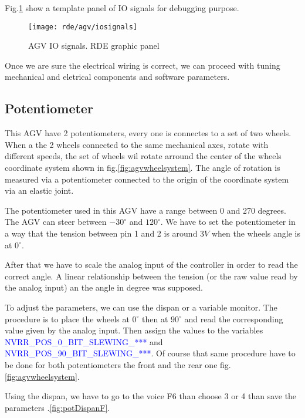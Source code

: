 Fig.\ref{fig:iosignals} show a template panel of IO signals for debugging purpose.
\begin{figure}[!]
	\centering\texttt{[image: rde/agv/iosignals]}
	\caption{AGV IO signals. RDE graphic panel}
	\label{fig:iosignals}
\end{figure}

Once we are sure the electrical wiring is correct, we can proceed with tuning mechanical and eletrical components and software parameters.

%
\subsection{Potentiometer}
This AGV have 2 potentiometers, every one is connectes to a set of two wheels. When a the 2 wheels connected to the same mechanical axes, rotate with different speeds, the set of wheels wil rotate arround the center of the wheels coordinate system shown in fig.\ref{fig:agvwheelsystem}. The angle of rotation is measured via a potentiometer connected to the origin of the coordinate system via an elastic joint.

The potentiometer used in this AGV have a range between 0 and 270 degrees. The AGV can steer between $-30^{\circ}$ and $120^{\circ}$. We have to set the potentiometer in a way that the tension between pin 1 and 2 is around $3V$ when the wheels angle is at $0^{\circ}$.

After that we have to scale the analog input of the controller in order to read the correct angle. A linear relationship between the tension (or the raw value read by the analog input) an the angle in degree was supposed.

To adjust the parameters, we can use the dispan or a variable monitor. The procedure is to place the wheels at $0^{\circ}$ then at $90^{\circ}$ and read the corresponding value given by the analog input. Then assign the values to the variables \textcolor{blue}{NVRR\_POS\_0\_BIT\_SLEWING\_***} and \textcolor{blue}{NVRR\_POS\_90\_BIT\_SLEWING\_***}. Of course that same procedure have to be done for both potentiometers the front and the rear one fig.\ref{fig:agvwheelsystem}.

Using the dispan, we have to go to the voice F6 than choose 3 or 4 than save the parameters \figurename.\ref{fig:potDispanF}.

